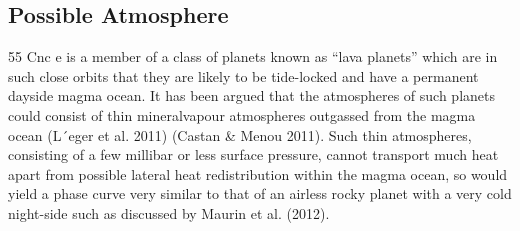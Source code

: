 \subsection*{Possible Atmosphere}

55 Cnc e is a member of a class of planets known as
“lava planets” which are in such close orbits that they
are likely to be tide-locked and have a permanent dayside magma ocean. It has been argued that the atmospheres of such planets could consist of thin mineralvapour atmospheres outgassed from the magma ocean
(L´eger et al. 2011) (Castan & Menou 2011). Such thin
atmospheres, consisting of a few millibar or less surface
pressure, cannot transport much heat apart from possible lateral heat redistribution within the magma ocean,
so would yield a phase curve very similar to that of an
airless rocky planet with a very cold night-side such as
discussed by Maurin et al. (2012).

